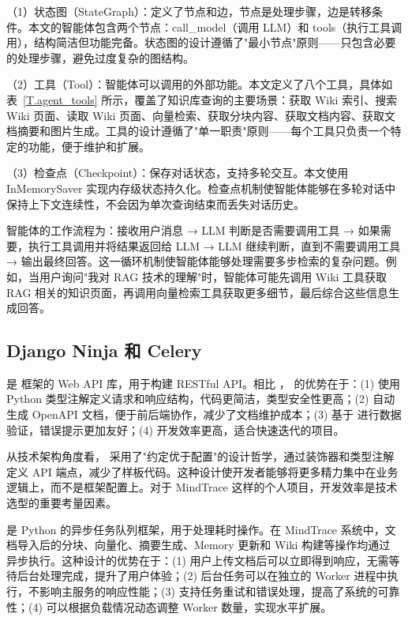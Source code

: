 （1）状态图（StateGraph）：定义了节点和边，节点是处理步骤，边是转移条件。本文的智能体包含两个节点：call\_model（调用 LLM）和 tools（执行工具调用），结构简洁但功能完备。状态图的设计遵循了"最小节点"原则——只包含必要的处理步骤，避免过度复杂的图结构。

（2）工具（Tool）：智能体可以调用的外部功能。本文定义了八个工具，具体如表~\ref{T.agent_tools} 所示，覆盖了知识库查询的主要场景：获取 Wiki 索引、搜索 Wiki 页面、读取 Wiki 页面、向量检索、获取分块内容、获取文档内容、获取文档摘要和图片生成。工具的设计遵循了"单一职责"原则——每个工具只负责一个特定的功能，便于维护和扩展。

（3）检查点（Checkpoint）：保存对话状态，支持多轮交互。本文使用 InMemorySaver 实现内存级状态持久化。检查点机制使智能体能够在多轮对话中保持上下文连续性，不会因为单次查询结束而丢失对话历史。

智能体的工作流程为：接收用户消息 → LLM 判断是否需要调用工具 → 如果需要，执行工具调用并将结果返回给 LLM → LLM 继续判断，直到不需要调用工具 → 输出最终回答。这一循环机制使智能体能够处理需要多步检索的复杂问题。例如，当用户询问"我对 RAG 技术的理解"时，智能体可能先调用 Wiki 工具获取 RAG 相关的知识页面，再调用向量检索工具获取更多细节，最后综合这些信息生成回答。

\subsection{Django Ninja 和 Celery}

 是  框架的 Web API 库，用于构建 RESTful API。相比 ， 的优势在于：(1) 使用 Python 类型注解定义请求和响应结构，代码更简洁，类型安全性更高；(2) 自动生成 OpenAPI 文档，便于前后端协作，减少了文档维护成本；(3) 基于  进行数据验证，错误提示更加友好；(4) 开发效率更高，适合快速迭代的项目。

从技术架构角度看， 采用了"约定优于配置"的设计哲学，通过装饰器和类型注解定义 API 端点，减少了样板代码。这种设计使开发者能够将更多精力集中在业务逻辑上，而不是框架配置上。对于 MindTrace 这样的个人项目，开发效率是技术选型的重要考量因素。

 是 Python 的异步任务队列框架，用于处理耗时操作。在 MindTrace 系统中，文档导入后的分块、向量化、摘要生成、Memory 更新和 Wiki 构建等操作均通过  异步执行。这种设计的优势在于：(1) 用户上传文档后可以立即得到响应，无需等待后台处理完成，提升了用户体验；(2) 后台任务可以在独立的 Worker 进程中执行，不影响主服务的响应性能；(3) 支持任务重试和错误处理，提高了系统的可靠性；(4) 可以根据负载情况动态调整 Worker 数量，实现水平扩展。

